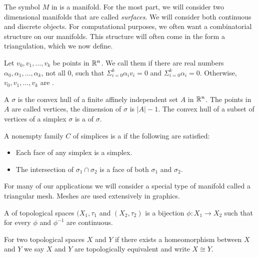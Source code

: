 The symbol $M$ in  is a manifold. For the most part, we will consider two dimensional manifolds that are called \emph{surfaces}.
We will consider both continuous and discrete objects.
For computational purposes, we often want a combinatorial structure on our manifolds.
This structure will often come in the form a triangulation, which we now define.


\begin{definition}
Let $v_0,v_1,\ldots,v_k$ be points in $\mathbb{R}^n$. We call them 
if there are real numbers $\alpha_0,\alpha_1,\ldots,\alpha_k$, not all 0, such that
$\Sigma_{i=0}^k \alpha_iv_i=0$ and $\Sigma_{i=0}^k \alpha_i=0.$
Otherwise,  $v_0,v_1,\ldots,v_k$ are .

\end{definition}

\begin{definition}[Simplices]
A  $\sigma$ is the convex hull of a finite affinely independent
set $A$ in $\mathbb{R}^n$. The points in  $A$ are  called vertices, the dimension
of  $\sigma$ is $|A|-1$.  The convex hull of a subset of vertices of a simplex
$\sigma$ is a  of $\sigma$.
\end{definition}

\begin{definition}
A nonempty family $C$ of simplices is a  if the following
are satisfied:
\begin{itemize}
\item  Each face of any simplex is a simplex.
\item The intersection of $\sigma_1 \cap \sigma_2$ is a face of both $\sigma_1$ and 
$\sigma_2$.
\end{itemize}


\end{definition}

For many of our applications we will consider a special type of manifold called
a triangular mesh. Meshes are used extensively in graphics.


\begin{definition}[Homeomorphism]
A    of topological spaces $(X_1,\tau_1$ and $(X_2,\tau_2)$
is a bijection $\phi:X_1\to X_2$ such that for every $\phi$ and $\phi^{-1}$ are continuous.
\end{definition}
For two topological spaces $X$ and $Y$ if there exists a  homeomorphism between
$X$ and $Y$ we say $X$ and $Y$ are topologically  equivalent and write  $X\cong Y.$

